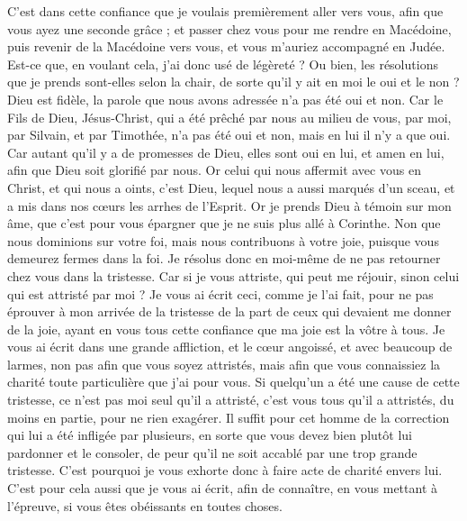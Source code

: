 \begin{multicols}{2}
C’est dans cette confiance que je voulais premièrement aller vers vous, afin que vous ayez une seconde grâce ;
et passer chez vous pour me rendre en Macédoine, puis revenir de la Macédoine vers vous, et vous m’auriez accompagné en Judée.
Est-ce que, en voulant cela, j’ai donc usé de légèreté ? Ou bien, les résolutions que je prends sont-elles selon la chair, de sorte qu’il y ait en moi le oui et le non ?
Dieu est fidèle, la parole que nous avons adressée n’a pas été oui et non.
Car le Fils de Dieu, Jésus-Christ, qui a été prêché par nous au milieu de vous, par moi, par Silvain, et par Timothée, n'a pas été oui et non, mais en lui il n’y a que oui.
Car autant qu’il y a de promesses de Dieu, elles sont oui en lui, et amen en lui, afin que Dieu soit glorifié par nous.
Or celui qui nous affermit avec vous en Christ, et qui nous a oints, c'est Dieu,
lequel nous a aussi marqués d’un sceau, et a mis dans nos cœurs les arrhes de l'Esprit.
Or je prends Dieu à témoin sur mon âme, que c’est pour vous épargner que je ne suis plus allé à Corinthe.
Non que nous dominions sur votre foi, mais nous contribuons à votre joie, puisque vous demeurez fermes dans la foi.
\VerseOne{}Je résolus donc en moi-même de ne pas retourner chez vous dans la tristesse.
Car si je vous attriste, qui peut me réjouir, sinon celui qui est attristé par moi ?
Je vous ai écrit ceci, comme je l’ai fait, pour ne pas éprouver à mon arrivée de la tristesse de la part de ceux qui devaient me donner de la joie, ayant en vous tous cette confiance que ma joie est la vôtre à tous.
Je vous ai écrit dans une grande affliction, et le cœur angoissé, et avec beaucoup de larmes, non pas afin que vous soyez attristés, mais afin que vous connaissiez la charité toute particulière que j'ai pour vous.
Si quelqu'un a été une cause de cette tristesse, ce n'est pas moi seul qu'il a attristé, c'est vous tous qu'il a attristés, du moins en partie, pour ne rien exagérer.
Il suffit pour cet homme de la correction qui lui a été infligée par plusieurs,
en sorte que vous devez bien plutôt lui pardonner et le consoler, de peur qu’il ne soit accablé par une trop grande tristesse.
C'est pourquoi je vous exhorte donc à faire acte de charité envers lui.
C’est pour cela aussi que je vous ai écrit, afin de connaître, en vous mettant à l’épreuve, si vous êtes obéissants en toutes choses.

\end{multicols}
